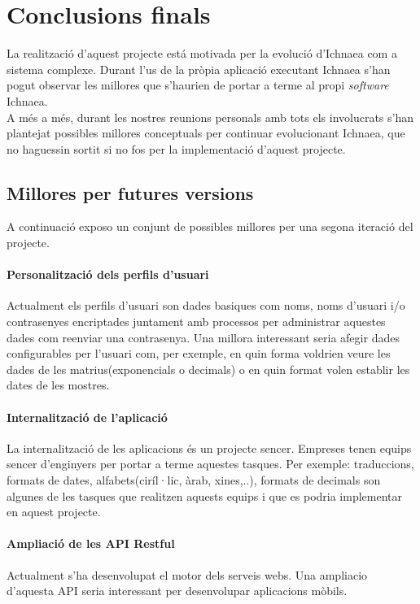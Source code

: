\section{Conclusions finals}
La realització d'aquest projecte est\'{a} motivada per la evolució d'Ichnaea com a sistema complexe. Durant l'us de la pròpia aplicació executant Ichnaea s'han pogut observar les millores que s'haurien de portar a terme al propi \textit{software} Ichnaea.\\

A m\'{e}s a m\'{e}s, durant les nostres reunions personals amb tots els involucrats s'han plantejat possibles millores conceptuals per continuar evolucionant Ichnaea, que no haguessin sortit si no fos per la implementació d'aquest projecte. 

\subsection{Millores per futures versions}
A continuació exposo un conjunt de possibles millores per una segona iteració del projecte.

\paragraph*{Personalitzaci\'{o} dels perfils d'usuari} Actualment els perfils d'usuari son dades basiques com noms, noms d'usuari i/o contrasenyes encriptades juntament amb processos per administrar aquestes dades com reenviar una contrasenya. Una millora interessant seria afegir dades configurables per l'usuari com, per exemple, en quin forma voldrien veure les dades de les matrius(exponencials o decimals) o en quin format volen establir les dates de les mostres.

\paragraph*{Internalització de l'aplicació} La internalització de les aplicacions \'{e}s un projecte sencer. Empreses tenen equips sencer d'enginyers per portar a terme aquestes tasques. Per exemple: traduccions, formats de dates, alfabets(ciríl·lic, àrab, xines,..), formats de decimals son algunes de les tasques que realitzen aquests equips i que es podria implementar en aquest projecte. 

\paragraph*{Ampliaci\'{o} de les API Restful} Actualment s'ha desenvolupat el motor dels serveis webs. Una ampliacio d'aquesta API seria interessant per desenvolupar aplicacions mòbils.

